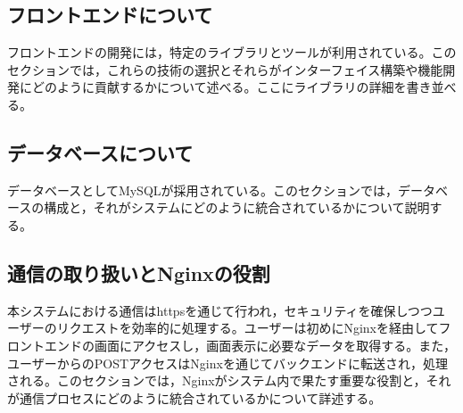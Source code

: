 \documentclass[b5paper,12pt]{jsreport}
\newcommand{\red}[1]{\textcolor{red}{#1}}
\begin{document}
\subsection{フロントエンドについて}
フロントエンドの開発には，特定のライブラリとツールが利用されている。このセクションでは，これらの技術の選択とそれらがインターフェイス構築や機能開発にどのように貢献するかについて述べる。ここにライブラリの詳細を書き並べる。

\subsection{データベースについて}
データベースとしてMySQLが採用されている。このセクションでは，データベースの構成と，それがシステムにどのように統合されているかについて説明する。

\subsection{通信の取り扱いとNginxの役割}
本システムにおける通信はhttpsを通じて行われ，セキュリティを確保しつつユーザーのリクエストを効率的に処理する。ユーザーは初めにNginxを経由してフロントエンドの画面にアクセスし，画面表示に必要なデータを取得する。また，ユーザーからのPOSTアクセスはNginxを通じてバックエンドに転送され，処理される。このセクションでは，Nginxがシステム内で果たす重要な役割と，それが通信プロセスにどのように統合されているかについて詳述する。







\end{document}

